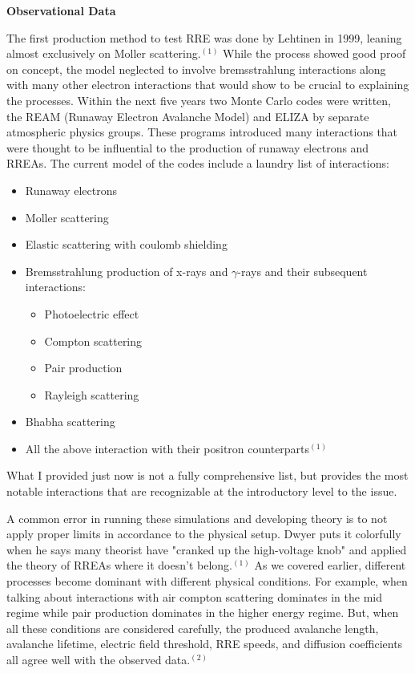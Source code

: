 \documentclass[11pt]{article}
\begin{document}
    \noindent
{\bf \LARGE Observational Data}

    \quad \quad The first production method to test RRE was done by Lehtinen in 1999, leaning almost exclusively on Moller scattering.$^{(1)}$ While the process showed good proof on concept, the model neglected to involve bremsstrahlung interactions along with many other electron interactions that would show to be crucial to explaining the processes. Within the next five years two Monte Carlo codes were written, the REAM (Runaway Electron Avalanche Model) and ELIZA by separate atmospheric physics groups. These programs introduced many interactions that were thought to be influential to the production of runaway electrons and RREAs. The current model of the codes include a laundry list of interactions:
    \begin{itemize}
        \item Runaway electrons
        \item Moller scattering
        \item Elastic scattering with coulomb shielding
        \item Bremsstrahlung production of x-rays and $\gamma$-rays and their subsequent interactions:
        \begin{itemize}
            \item Photoelectric effect
            \item Compton scattering
            \item Pair production
            \item Rayleigh scattering
        \end{itemize}
        \item Bhabha scattering
        \item All the above interaction with their positron counterparts$^{(1)}$
    \end{itemize}
    What I provided just now is not a fully comprehensive list, but provides the most notable interactions that are recognizable at the introductory level to the issue. 
    
    A common error in running these simulations and developing theory is to not apply proper limits in accordance to the physical setup. Dwyer puts it colorfully when he says many theorist have "cranked up the high-voltage knob" and applied the theory of RREAs where it doesn't belong.$^{(1)}$ As we covered earlier, different processes become dominant with different physical conditions. For example, when talking about interactions with air compton scattering dominates in the mid regime while pair production dominates in the higher energy regime. But, when all these conditions are considered carefully, the produced avalanche length, avalanche lifetime, electric field threshold, RRE speeds, and diffusion coefficients all agree well with the observed data.$^{(2)}$
    
\end{document}
